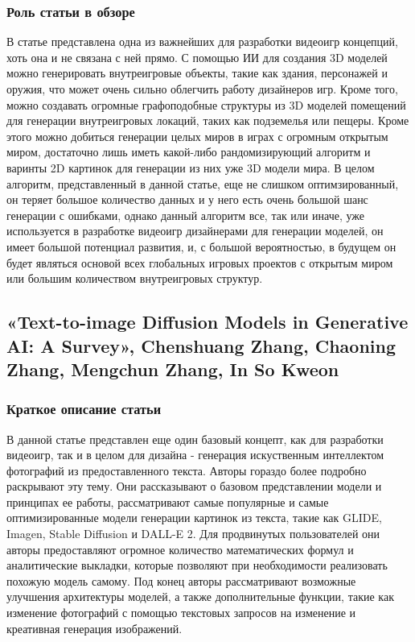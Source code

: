\documentclass[14pt]{article}
\begin{document}
\subsubsection{Роль статьи в обзоре}
В статье представлена одна из важнейших для разработки видеоигр концепций, хоть она и не связана с ней прямо. С помощью ИИ для создания 3D моделей можно генерировать внутреигровые объекты, такие как здания, персонажей и оружия, что может очень сильно облегчить работу дизайнеров игр. Кроме того, можно создавать огромные графоподобные структуры из 3D моделей помещений для генерации внутреигровых локаций, таких как подземелья или пещеры. Кроме этого можно добиться генерации целых миров в играх с огромным открытым миром, достаточно лишь иметь какой-либо рандомизирующий алгоритм и варинты 2D картинок для генерации из них уже 3D модели мира. В целом алгоритм, представленный в данной статье, еще не слишком оптимзированный, он теряет большое количество данных и у него есть очень большой шанс генерации с ошибками, однако данный алгоритм все, так или иначе, уже используется в разработке видеоигр дизайнерами для генерации моделей, он имеет большой потенциал развития, и, с большой вероятностью, в будущем он будет являться основой всех глобальных игровых проектов с открытым миром или большим количеством внутреигровых структур.

\subsection{«Text-to-image Diffusion Models in Generative AI:
A Survey», Chenshuang Zhang, Chaoning Zhang, Mengchun Zhang, In So Kweon}
\subsubsection{Краткое описание статьи}
В данной статье представлен еще один базовый концепт, как для разработки видеоигр, так и в целом для дизайна - генерация искуственным интеллектом фотографий из предоставленного текста. Авторы гораздо более подробно раскрывают эту тему. Они рассказывают о базовом представлении модели и принципах ее работы, рассматривают самые популярные и самые оптимизированные модели генерации картинок из текста, такие как GLIDE, Imagen, Stable Diffusion и DALL-E 2. Для продвинутых пользователей они авторы предоставляют огромное количество математических формул и аналитические выкладки, которые позволяют при необходимости реализовать похожую модель самому. Под конец авторы рассматривают возможные улучшения архитектуры моделей, а также дополнительные функции, такие как изменение фотографий с помощью текстовых запросов на изменение и креативная генерация изображений. 
\end{document}
